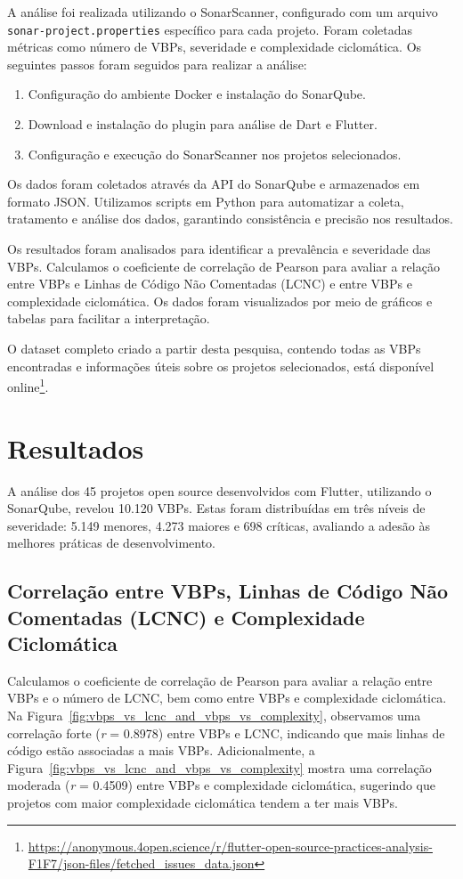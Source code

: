 \documentclass[12pt]{article}
\begin{document}
A análise foi realizada utilizando o SonarScanner, configurado com um arquivo \texttt{sonar-project.properties} específico para cada projeto. Foram coletadas métricas como número de VBPs, severidade e complexidade ciclomática. Os seguintes passos foram seguidos para realizar a análise:
\begin{enumerate}
    \item Configuração do ambiente Docker e instalação do SonarQube.
    \item Download e instalação do plugin para análise de Dart e Flutter.
    \item Configuração e execução do SonarScanner nos projetos selecionados.
\end{enumerate}

Os dados foram coletados através da API do SonarQube e armazenados em formato JSON. Utilizamos scripts em Python para automatizar a coleta, tratamento e análise dos dados, garantindo consistência e precisão nos resultados. 

Os resultados foram analisados para identificar a prevalência e severidade das VBPs. Calculamos o coeficiente de correlação de Pearson para avaliar a relação entre VBPs e Linhas de Código Não Comentadas (LCNC) e entre VBPs e complexidade ciclomática. Os dados foram visualizados por meio de gráficos e tabelas para facilitar a interpretação.

O dataset completo criado a partir desta pesquisa, contendo todas as VBPs encontradas e informações úteis sobre os projetos selecionados, está disponível online\footnote{\url{https://anonymous.4open.science/r/flutter-open-source-practices-analysis-F1F7/json-files/fetched_issues_data.json}}.


\section{Resultados}

A análise dos 45 projetos open source desenvolvidos com Flutter, utilizando o SonarQube, revelou 10.120 VBPs. Estas foram distribuídas em três níveis de severidade: 5.149 menores, 4.273 maiores e 698 críticas, avaliando a adesão às melhores práticas de desenvolvimento.

\subsection{Correlação entre VBPs, Linhas de Código Não Comentadas (LCNC) e Complexidade Ciclomática}
Calculamos o coeficiente de correlação de Pearson para avaliar a relação entre VBPs e o número de LCNC, bem como entre VBPs e complexidade ciclomática. Na Figura~\ref{fig:vbps_vs_lcnc_and_vbps_vs_complexity}, observamos uma correlação forte (\textit{r} = 0.8978) entre VBPs e LCNC, indicando que mais linhas de código estão associadas a mais VBPs. Adicionalmente, a Figura~\ref{fig:vbps_vs_lcnc_and_vbps_vs_complexity} mostra uma correlação moderada (\textit{r} = 0.4509) entre VBPs e complexidade ciclomática, sugerindo que projetos com maior complexidade ciclomática tendem a ter mais VBPs.
\end{document}
